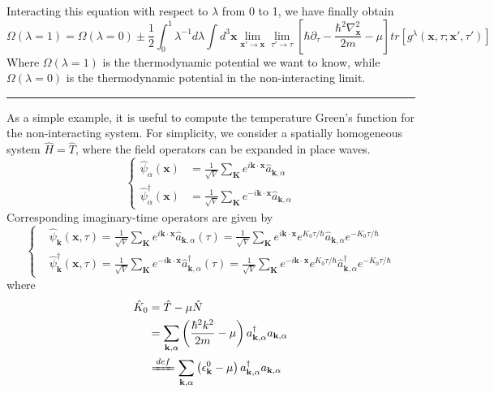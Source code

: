 Interacting this equation with respect to $\lambda$ from 0 to 1, we have finally obtain
\begin{equation}\label{eq4.1.18}
\Omega(\lambda=1)=\Omega(\lambda=0)\pm\frac{1}{2}\int_{0}^{1}\lambda^{-1}d\lambda \int d^{3}\mathbf{x}\lim_{\mathbf{x'}\rightarrow\mathbf{x}} \lim_{\tau'\rightarrow\tau} \left[\hbar\partial_{\tau}-\frac{\hbar^{2}\nabla^{2}_{\mathbf{x}}}{2m}-\mu\right] tr\left[g^{\lambda}(\mathbf{x},\tau;\mathbf{x'},\tau')\right]
\end{equation}
Where $\Omega(\lambda=1)$ is the thermodynamic potential we want to know, while $\Omega(\lambda=0)$ is the thermodynamic potential in the non-interacting limit.\\
\rule{\textwidth}{1mm}
As a simple example, it is useful to compute the temperature Green's function for the non-interacting system.
For simplicity, we consider a spatially homogeneous system $\hat{H}=\hat{T}$, where the field operators can be expanded in place waves.
\begin{equation}
\left\{
\begin{aligned}
\hat{\psi}_{\alpha}(\mathbf{x})&=\frac{1}{\sqrt{V}}\sum_{\mathbf{K}}e^{i\mathbf{k}\cdotp\mathbf{x}}\hat{a}_{\mathbf{k},\alpha}\\
\hat{\psi}_{\alpha}^{\dagger}(\mathbf{x})&=\frac{1}{\sqrt{V}}\sum_{\mathbf{K}}e^{-i\mathbf{k}\cdotp\mathbf{x}}\hat{a}_{\mathbf{k},\alpha}
\end{aligned}
\right.
\end{equation}
Corresponding imaginary-time operators are given by
\begin{equation}
\left\{
\begin{aligned}
&\hat{\psi}_{\mathbf{k}}(\mathbf{x},\tau)=\frac{1}{\sqrt{V}}\sum_{\mathbf{K}}e^{i\mathbf{k}\cdotp\mathbf{x}} \hat{a}_{\mathbf{k},\alpha}(\tau) =\frac{1}{\sqrt{V}}\sum_{\mathbf{K}}e^{i\mathbf{k}\cdotp\mathbf{x}} e^{K_{0}\tau/\hbar} \hat{a}_{\mathbf{k},\alpha} e^{-K_{0}\tau/\hbar} \\
&\hat{\psi}_{\mathbf{k}}^{\dagger}(\mathbf{x},\tau)=\frac{1}{\sqrt{V}}\sum_{\mathbf{K}}e^{-i\mathbf{k}\cdotp\mathbf{x}} \hat{a}_{\mathbf{k},\alpha}^{\dagger}(\tau) =\frac{1}{\sqrt{V}}\sum_{\mathbf{K}}e^{-i\mathbf{k}\cdotp\mathbf{x}} e^{K_{0}\tau/\hbar} \hat{a}_{\mathbf{k},\alpha}^{\dagger} e^{-K_{0}\tau/\hbar}
\end{aligned}
\right.
\end{equation}
where
\begin{equation}
\begin{aligned}
\hat{K}_{0}&=\hat{T}-\mu\hat{N}\\
&=\sum_{\mathbf{k,\alpha}}\left(\frac{\hbar^{2}k^{2}}{2m}-\mu\right) a_{\mathbf{k},\alpha}^{\dagger}a_{\mathbf{k},\alpha}\\
&\xlongequal{def} \sum_{\mathbf{k,\alpha}}\left(\epsilon_{\mathbf{k}}^{0}-\mu\right) a_{\mathbf{k},\alpha}^{\dagger}a_{\mathbf{k},\alpha}
\end{aligned}
\end{equation}
